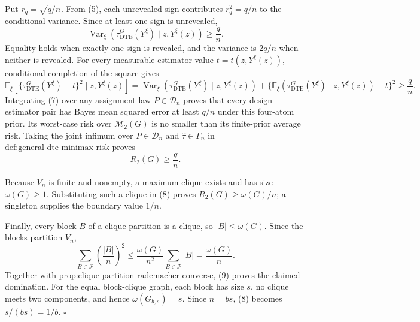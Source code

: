 Put \(r_q=\sqrt{q/n}\).  From (5), each unrevealed sign contributes \(r_q^2=q/n\) to the conditional variance.  Since at least one sign is unrevealed,
\[
\operatorname{Var}_{\xi}\!\left(
\tau_{\mathrm{DTE}}^G(Y^{\xi})
\mid z,Y^{\xi}(z)
\right)\geq\frac qn.
\tag{6}
\]
Equality holds when exactly one sign is revealed, and the variance is \(2q/n\) when neither is revealed.  For every measurable estimator value \(t=t(z,Y^{\xi}(z))\), conditional completion of the square gives
\[
\mathbb E_{\xi}\!\left[
\{\tau_{\mathrm{DTE}}^G(Y^{\xi})-t\}^2
\mid z,Y^{\xi}(z)
\right]
=\operatorname{Var}_{\xi}(\tau_{\mathrm{DTE}}^G(Y^{\xi})\mid z,Y^{\xi}(z))
+\{\mathbb E_{\xi}(\tau_{\mathrm{DTE}}^G(Y^{\xi})\mid z,Y^{\xi}(z))-t\}^2
\geq\frac qn.
\tag{7}
\]
Integrating (7) over any assignment law \(P\in\mathcal D_n\) proves that every design--estimator pair has Bayes mean squared error at least \(q/n\) under this four-atom prior.  Its worst-case risk over \(\mathcal M_2(G)\) is no smaller than its finite-prior average risk.  Taking the joint infimum over \(P\in\mathcal D_n\) and \(\widehat\tau\in\Gamma_n\) in \(\text{def:general-dte-minimax-risk}\) proves
\[
R_2(G)\geq\frac qn.
\tag{8}
\]

Because \(V_n\) is finite and nonempty, a maximum clique exists and has size \(\omega(G)\geq1\).  Substituting such a clique in (8) proves \(R_2(G)\geq\omega(G)/n\); a singleton supplies the boundary value \(1/n\).

Finally, every block \(B\) of a clique partition is a clique, so \(|B|\leq\omega(G)\).  Since the blocks partition \(V_n\),
\[
\sum_{B\in\mathcal P}\left(\frac{|B|}{n}\right)^2
\leq\frac{\omega(G)}{n^2}\sum_{B\in\mathcal P}|B|
=\frac{\omega(G)}n.
\tag{9}
\]
Together with \(\text{prop:clique-partition-rademacher-converse}\), (9) proves the claimed domination.  For the equal block-clique graph, each block has size \(s\), no clique meets two components, and hence \(\omega(G_{b,s})=s\).  Since \(n=bs\), (8) becomes \(s/(bs)=1/b\).  \(\square\)